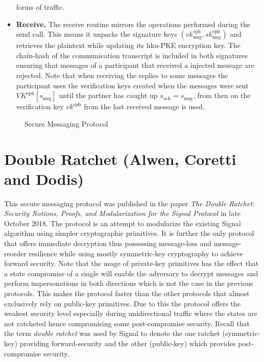 \documentclass[11pt,a4paper,twoside,openright,bibliography=totoc]{scrbook}
\renewcommand{\t}{\text} %
\begin{document}
\begin{itemize}
  forms of traffic.
\item \textbf{Receive.} The receive routine mirrors the operations performed
  during the send call. This means it unpacks the signature keys
  $(vk_\t{msg}^\t{eph},sk_\t{msg}^\t{eph})$ and retrieves the plaintext while
  updating its hku-PKE encryption key. The chain-hash
  of the communication transcript is included in both signatures ensuring
  that messages of a participant that received a injected message are rejected.
  Note that when receiving the replies to some messages the participant
  uses the verification keys created when the messages were sent
  $VK^\t{eph}[s_\t{msg}]$ until
  the partner has caught up $s_\t{ack} = s_\t{msg}$, from then on
  the verification key $vk^\t{eph}$ from the last received message is used.
\end{itemize}

\begin{figure}[p]
  \centering
  \setlength{\fboxsep}{10pt}
  \scalebox{0.9}{%
    \fbox{%
      
    } 
  }
  \caption{Secure Messaging Protocol}
  \label{fig:secmsg}
\end{figure}

\clearpage

\section[Double Ratchet (Alwen, Coretti and Dodis)]
{Double Ratchet (Alwen, Coretti and Dodis)~\cite{alwen2018double}}
\label{sec:alwen-coretti-dodis}

This secure messaging protocol was published in the paper \textit{The
Double Ratchet: Security Notions, Proofs, and Modularization for the
Signal Protocol} in late October 2018. The protocol is an attempt to
modularize the existing Signal algorithm using simpler cryptographic
primitives. It is further the only protocol that offers immediate
decryption thus possessing message-loss and message-reorder resilience
while using mostly symmetric-key cryptography to achieve forward security.
Note that the usage of private-key primitives has the effect that
a state compromise of a single will enable the adversary to
decrypt messages and perform impersonations in both directions which
is not the case in the previous protocols.
This makes the protocol faster than the
other protocols that almost exclusively rely on public-key primitives.
Due to this the protocol offers the weakest security level especially
during unidirectional traffic where the states are not ratcheted hence
compromising some post-compromise security. Recall that the term
\textit{double ratchet} was used by Signal to denote the one ratchet
(symmetric-key)
providing forward-security and the other (public-key) which provides post-compromise
security.
\end{document}
